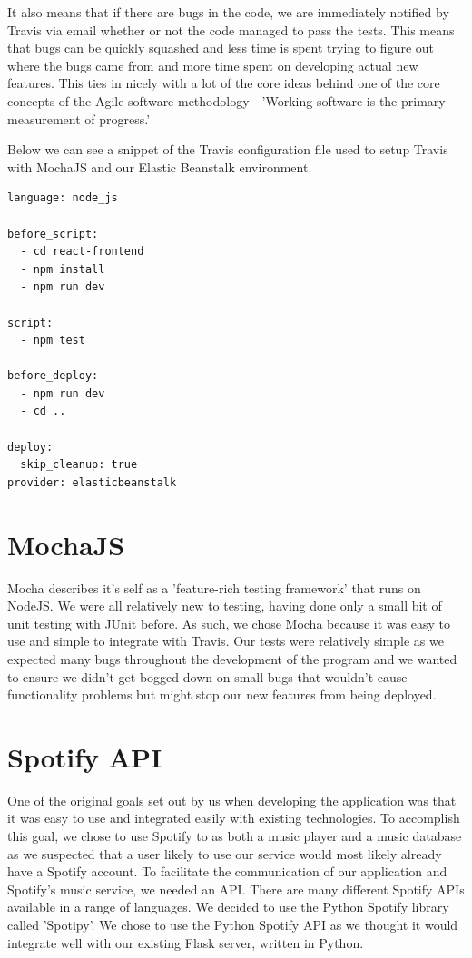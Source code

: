 It also means that if there are bugs in the code, we are immediately notified by Travis via email whether or not the code managed to pass the tests. This means that bugs can be quickly squashed and less time is spent trying to figure out where the bugs came from and more time spent on developing actual new features. This ties in nicely with a lot of the core ideas behind one of the core concepts of the Agile software methodology - 'Working software is the primary measurement of progress.'

Below we can see a snippet of the Travis configuration file used to setup Travis with MochaJS and our Elastic Beanstalk environment.
\begin{verbatim}
language: node_js

before_script: 
  - cd react-frontend 
  - npm install
  - npm run dev
  
script:
  - npm test

before_deploy:
  - npm run dev
  - cd ..

deploy:
  skip_cleanup: true
provider: elasticbeanstalk
  \end{verbatim}

\section{MochaJS}
Mocha describes it's self as a 'feature-rich testing framework' that runs on NodeJS. We were all relatively new to testing, having done only a small bit of unit testing with JUnit before. As such, we chose Mocha because it was easy to use and simple to integrate with Travis. 
Our tests were relatively simple as we expected many bugs throughout the development of the program and we wanted to ensure we didn't get bogged down on small bugs that wouldn't cause functionality problems but might stop our new features from being deployed.

\section{Spotify API}
One of the original goals set out by us when developing the application was that it was easy to use and integrated easily with existing technologies. To accomplish this goal, we chose to use Spotify to as both a music player and a music database as we suspected that a user likely to use our service would most likely already have a Spotify account. 
To facilitate the communication of our application and Spotify's music service, we needed an API. There are many different Spotify APIs available in a range of languages. We decided to use the Python Spotify library called 'Spotipy'. We chose to use the Python Spotify API as we thought it would integrate well with our existing Flask server, written in Python.

